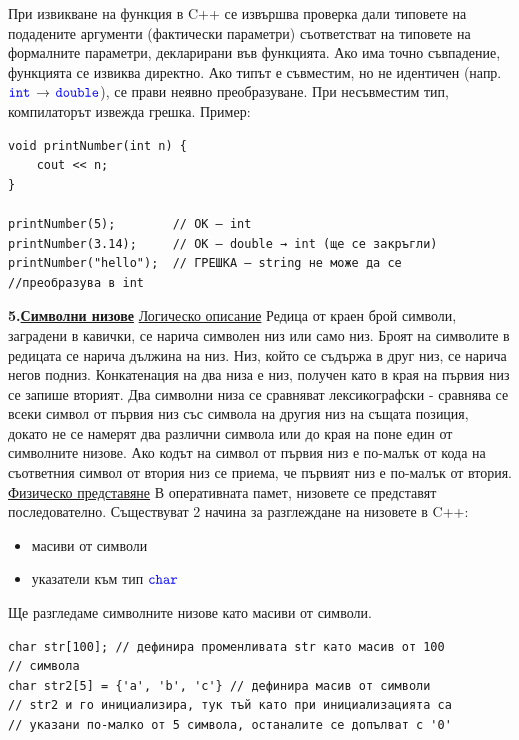 \documentclass{article}
\begin{document}
При извикване на функция в C++ се извършва проверка дали типовете на подадените аргументи (фактически параметри) съответстват на типовете на
формалните параметри, декларирани във функцията. Ако има точно съвпадение, функцията се извиква директно. Ако типът е съвместим, но не идентичен
(напр. $\textcolor{blue}{\texttt{int}}$ → $\textcolor{blue}{\texttt{double}}$), се прави неявно преобразуване. При несъвместим тип, компилаторът извежда грешка. \newline\newline
Пример:
\begin{lstlisting}[style=cpp]
void printNumber(int n) {
    cout << n;
}

printNumber(5);        // OK – int
printNumber(3.14);     // OK – double → int (ще се закръгли)
printNumber("hello");  // ГРЕШКА – string не може да се
//преобразува в int
\end{lstlisting}
\textbf{5.\underline{Символни низове}} \newline\newline
\underline{Логическо описание} \newline
Редица от краен брой символи, заградени в кавички, се нарича символен низ или само низ. Броят на символите в редицата се нарича
дължина на низ. Низ, който се съдържа в друг низ, се нарича негов подниз. Конкатенация на два низа е низ, получен като в края на
първия низ се запише вторият. Два символни низа се сравняват лексикографски - сравнява се всеки символ от първия низ със символа
на другия низ на същата позиция, докато не се намерят два различни символа или до края на поне един от символните низове. Ако
кодът на символ от първия низ е по-малък от кода на съответния символ от втория низ се приема, че първият низ е по-малък от втория. \newline\newline
\underline{Физическо представяне} \newline
В оперативната памет, низовете се представят последователно. Съществуват 2 начина за разглеждане на низовете в C++:
\begin{itemize}
    \item масиви от символи
    \item указатели към тип $\textcolor{blue}{\texttt{char}}$
\end{itemize}
Ще разгледаме символните низове като масиви от символи.
\begin{lstlisting}[style=cpp]
char str[100]; // дефинира променливата str като масив от 100
// символа
char str2[5] = {'a', 'b', 'c'} // дефинира масив от символи
// str2 и го инициализира, тук тъй като при инициализацията са
// указани по-малко от 5 символа, останалите се допълват с '0'
\end{lstlisting}
\end{document}
